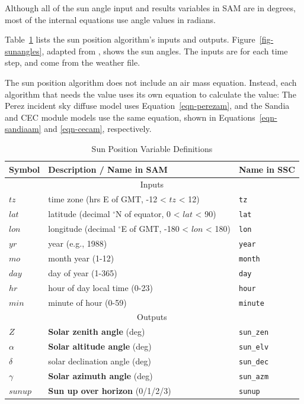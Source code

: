 \documentclass[12pt,letterpaper]{article}
\begin{document}
Although all of the sun angle input and results variables in SAM are in degrees, most of the internal equations use angle values in radians.

Table~\ref{tab-sunposvars} lists the sun position algorithm's inputs and outputs. Figure~\ref{fig-sunangles}, adapted from \citet{dunlap2007}, shows the sun angles. The inputs are for each time step, and come from the weather file. 

The sun position algorithm does not include an air mass equation. Instead, each algorithm that needs the value uses its own equation to calculate the value: The Perez incident sky diffuse model uses Equation~\ref{eqn-perezam}, and the Sandia and CEC module models use the same equation, shown in Equations~\ref{eqn-sandiaam} and \ref{eqn-cecam}, respectively. 

\begin{table}
\begin{center}
\caption{Sun Position Variable Definitions}
\begin{tabular}{lll}
\midrule
Symbol & Description / \textbf{Name in SAM} & Name in SSC\\
\midrule
\multicolumn{3}{c}{Inputs}\\
$\mathit{tz}$ & time zone (hrs E of GMT, -12 < $tz$ < 12) & \texttt{tz}\\
$\mathit{lat}$ & latitude (decimal $^\circ$N of equator, 0 < $lat$ < 90) & \texttt{lat}\\
$\mathit{lon}$ & longitude (decimal $^\circ$E of GMT, -180 < $lon$ < 180) & \texttt{lon}\\
$\mathit{yr}$ & year (e.g., 1988) & \texttt{year}\\
$\mathit{mo}$ & month year (1-12) & \texttt{month}\\
$\mathit{day}$ & day of year (1-365) & \texttt{day}\\
$\mathit{hr}$ & hour of day local time (0-23) & \texttt{hour}\\
$\mathit{min}$ & minute of hour (0-59) & \texttt{minute}\\
\midrule
\multicolumn{3}{c}{Outputs}\\
$Z$ & \textbf{Solar zenith angle} (deg) & \texttt{sun\_zen}\\
$\alpha$ & \textbf{Solar altitude angle} (deg) & \texttt{sun\_elv}\\
$\delta$ & solar declination angle (deg) & \texttt{sun\_dec}\\
$\gamma$ & \textbf{Solar azimuth angle} (deg) & \texttt{sun\_azm}\\
$\mathit{sunup}$ & \textbf{Sun up over horizon}  (0/1/2/3)& \texttt{sunup}\\
\midrule
\end{tabular}
\label{tab-sunposvars}
\end{center}
\end{table}
\end{document}
